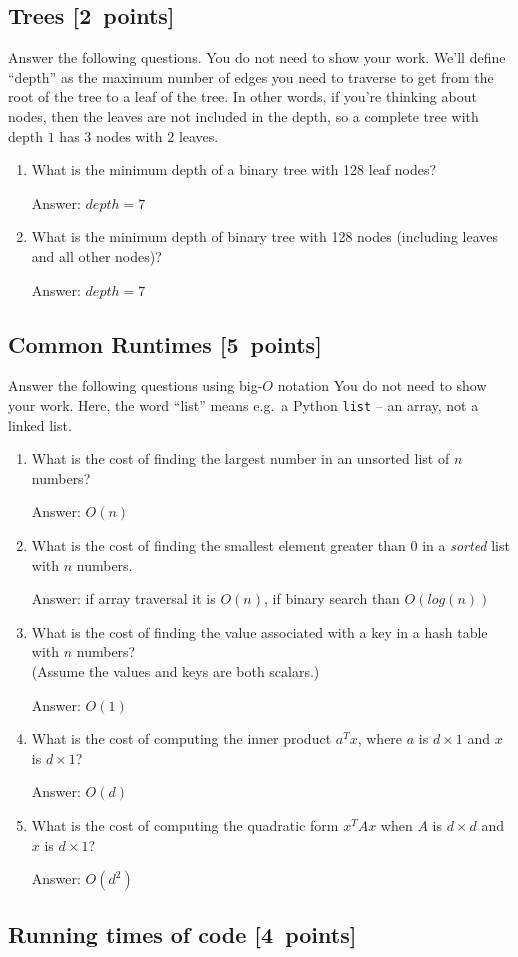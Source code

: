 \documentclass{article}
\newcommand{\blu}[1]{{\textcolor{blu}{#1}}}
\newcommand{\gre}[1]{\textcolor{gre}{#1}}
\newcommand\ans[1]{\par\gre{Answer: #1}}
\let\ask\blu
\newcommand\pts[1]{\textcolor{pointscolour}{[#1~points]}}
\begin{document}
  \subsection{Trees \pts{2}}

  \ask{Answer the following questions.} You do not need to show your work. We'll define ``depth'' as the maximum number of edges you need to traverse to get from the root of the tree to a leaf of the tree. In other words, if you're thinking about nodes, then the leaves are not included in the depth, so a complete tree with depth $1$ has 3 nodes with 2 leaves.


  \begin{enumerate}
  \item What is the minimum depth of a binary tree with 128 leaf nodes?
  \ans{$depth = 7$}
  \item What is the minimum depth of binary tree with 128 nodes (including leaves and all other nodes)?
  \ans{$depth = 7$}
  \end{enumerate}
  \newpage
  \subsection{Common Runtimes \pts{5}}

  \ask{Answer the following questions using big-$O$ notation} You do not need to show your work.
  Here, the word ``list'' means e.g.\ a Python \texttt{list} -- an array, not a linked list.
  \begin{enumerate}
  \item What is the cost of finding the largest number in an unsorted list of $n$ numbers?
  \ans{$O(n)$}
  \item What is the cost of finding the smallest element greater than 0 in a \emph{sorted} list with $n$ numbers.
  \ans{if array traversal it is $O(n)$, if binary search than $O(log(n))$}
  \item What is the cost of finding the value associated with a key in a hash table with $n$ numbers? \\(Assume the values and keys are both scalars.)
  \ans{$O(1)$}
  \item What is the cost of computing the inner product $a^Tx$, where $a$ is $d \times 1$ and $x$ is $d \times 1$?
  \ans{$O(d)$}
  \item What is the cost of computing the quadratic form $x^TAx$ when $A$ is $d \times d$ and $x$ is $d \times 1$?
  \ans{$O(d^2)$}
  \end{enumerate}
  \newpage
  \subsection{Running times of code \pts{4}}
\end{document}
